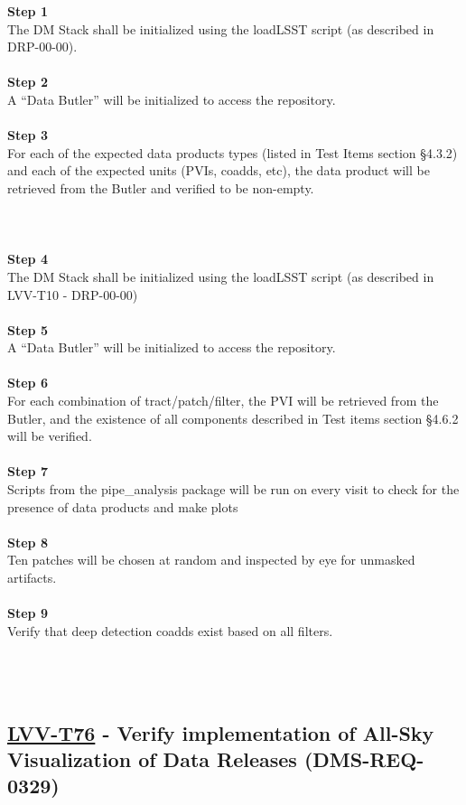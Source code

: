 \textbf{Step 1}\\
The DM Stack shall be initialized using the loadLSST script (as
described in DRP-00-00).\\
~\\
\textbf{Step 2}\\
A ``Data Butler'' will be initialized to access the repository.\\
~\\
\textbf{Step 3}\\
For each of the expected data products types (listed in Test Items
section §4.3.2) and each of the expected units (PVIs, coadds, etc), the
data product will be retrieved from the Butler and verified to be
non-empty.\\
~\\
~\\
~\\
\textbf{Step 4}\\
The DM Stack shall be initialized using the loadLSST script (as
described in LVV-T10 - DRP-00-00)\\
~\\
\textbf{Step 5}\\
A ``Data Butler'' will be initialized to access the repository.\\
~\\
\textbf{Step 6}\\
For each combination of tract/patch/filter, the PVI will be retrieved
from the Butler, and the existence of all components described in Test
items section §4.6.2 will be verified.\\
~\\
\textbf{Step 7}\\
Scripts from the pipe\_analysis package will be run on every visit to
check for the presence of data products and make plots\\
~\\
\textbf{Step 8}\\
Ten patches will be chosen at random and inspected by eye for unmasked
artifacts.\\
~\\
\textbf{Step 9}\\
Verify that deep detection coadds exist based on all filters.\\
~\\
~\\
~\\

\hypertarget{lvv-t76---verify-implementation-of-all-sky-visualization-of-data-releases-dms-req-0329}{%
\subsection{\texorpdfstring{\href{https://jira.lsstcorp.org/secure/Tests.jspa\#/testCase/LVV-T76}{LVV-T76}
- Verify implementation of All-Sky Visualization of Data Releases
(DMS-REQ-0329)}{LVV-T76 - Verify implementation of All-Sky Visualization of Data Releases (DMS-REQ-0329)}}\label{lvv-t76---verify-implementation-of-all-sky-visualization-of-data-releases-dms-req-0329}}

